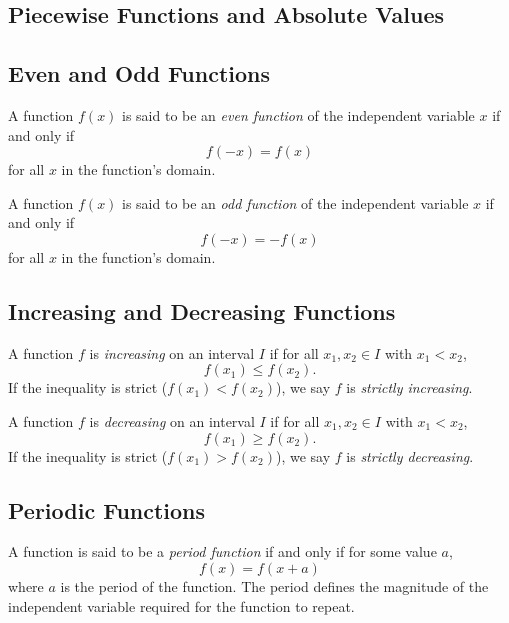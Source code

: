         \subsection{Piecewise Functions and Absolute Values}
        \subsection{Even and Odd Functions}
        \begin{definition}
            A function $f(x)$ is said to be an \textit{even function} of the independent variable $x$ if and only if
            $$
            f(-x) = f(x)
            $$
            for all $x$ in the function's domain.
        \end{definition}

        \begin{definition}
            A function $f(x)$ is said to be an \textit{odd function} of the independent variable $x$ if and only if
            $$
            f(-x) = -f(x)
            $$
            for all $x$ in the function's domain.
        \end{definition}

        \subsection{Increasing and Decreasing Functions}
        \begin{definition}
            A function $f$ is \textit{increasing} on an interval $I$ if for all $x_1, x_2 \in I$ with $x_1 < x_2$,
            $$
            f(x_1) \leq f(x_2).
            $$
            If the inequality is strict ($f(x_1) < f(x_2)$), we say $f$ is \textit{strictly increasing}.
        \end{definition}

        \begin{definition}
            A function $f$ is \textit{decreasing} on an interval $I$ if for all $x_1, x_2 \in I$ with $x_1 < x_2$,
            $$
            f(x_1) \geq f(x_2).
            $$
            If the inequality is strict ($f(x_1) > f(x_2)$), we say $f$ is \textit{strictly decreasing}.
        \end{definition}

        \subsection{Periodic Functions}
        \begin{definition}
            A function is said to be a \textit{period function} if and only if for some value $a$,
            $$
            f(x) = f(x+a)
            $$
            where $a$ is the period of the function. The period defines the magnitude of the independent variable required for the function to repeat.
        \end{definition}

